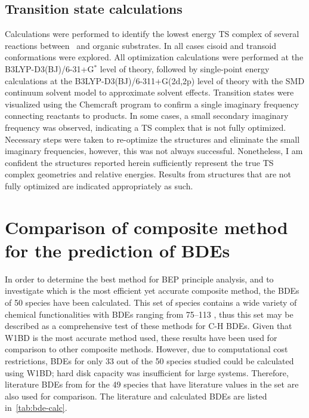 \subsection{Transition state calculations}

Calculations were performed to identify the lowest energy TS complex of several
reactions between \cumo\ and organic substrates. In all cases cisoid and
transoid conformations were explored. All optimization calculations were
performed at the B3LYP-D3(BJ)/6-31+G$^*$ level of theory, followed by
single-point energy calculations at the B3LYP-D3(BJ)/6-311+G(2d,2p) level of
theory with the SMD continuum solvent model\cite{Marenich2009} to approximate
solvent effects. Transition states were visualized using the Chemcraft
program\cite{ccraft} to confirm a single imaginary frequency connecting
reactants to products. In some cases, a small secondary imaginary frequency was
observed, indicating a TS complex that is not fully optimized. Necessary steps
were taken to re-optimize the structures and eliminate the small imaginary
frequencies, however, this was not always successful. Nonetheless, I am
confident the structures reported herein sufficiently represent the true TS
complex geometries and relative energies. Results from structures that are not
fully optimized are indicated appropriately as such.

\section{Comparison of composite method for the prediction of BDEs}

In order to determine the best method for BEP principle analysis, and to
investigate which is the most efficient yet accurate composite method, the BDEs
of 50 species have been calculated. This set of species contains a wide variety
of chemical functionalities with BDEs ranging from 75--113 \kcalmol, thus this
set may be described as a comprehensive test of these methods for C-H BDEs.
Given that W1BD is the most accurate method used, these results have been used
for comparison to other composite methods. However, due to computational cost
restrictions, BDEs for only 33 out of the 50 species studied could be
calculated using W1BD; hard disk capacity was insufficient for large systems.
Therefore, literature BDEs from \citet{Luo2002} for the 49 species that have
literature values in the set are also used for comparison. The literature and
calculated BDEs are listed in~\ref{tab:bde-calc}.

